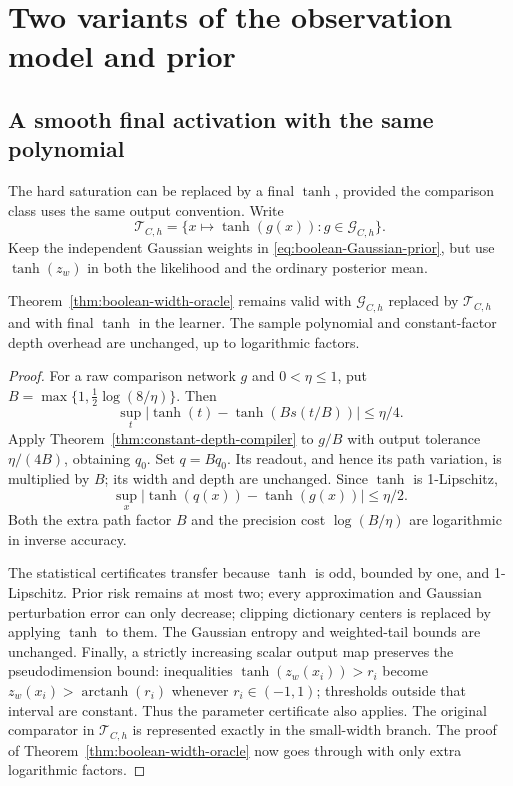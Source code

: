 \section{Two variants of the observation model and prior}
\label{sec:boolean-variants}

\subsection{A smooth final activation with the same polynomial}
The hard saturation can be replaced by a final $\tanh$, provided the comparison class uses the same output convention. Write
\[
 \mathcal T_{C,h}=\{x\mapsto\tanh(g(x)):g\in\mathcal G_{C,h}\}.
\]
Keep the independent Gaussian weights in \eqref{eq:boolean-Gaussian-prior}, but use $\tanh(z_w)$ in both the likelihood and the ordinary posterior mean.

\begin{corollary}
\label{cor:boolean-tanh-output}
Theorem~\ref{thm:boolean-width-oracle} remains valid with $\mathcal G_{C,h}$ replaced by $\mathcal T_{C,h}$ and with final $\tanh$ in the learner. The sample polynomial and constant-factor depth overhead are unchanged, up to logarithmic factors.
\end{corollary}
\begin{proof}
For a raw comparison network $g$ and $0<\eta\le1$, put
$B=\max\{1,\tfrac12\log(8/\eta)\}$. Then
\[
 \sup_t|\tanh(t)-\tanh(Bs(t/B))|\le\eta/4.
\]
Apply Theorem~\ref{thm:constant-depth-compiler} to $g/B$ with output tolerance $\eta/(4B)$, obtaining $q_0$. Set $q=Bq_0$. Its readout, and hence its path variation, is multiplied by $B$; its width and depth are unchanged. Since $\tanh$ is 1-Lipschitz,
\[
 \sup_x|\tanh(q(x))-\tanh(g(x))|\le\eta/2.
\]
Both the extra path factor $B$ and the precision cost $\log(B/\eta)$ are logarithmic in inverse accuracy.

The statistical certificates transfer because $\tanh$ is odd, bounded by one, and 1-Lipschitz. Prior risk remains at most two; every approximation and Gaussian perturbation error can only decrease; clipping dictionary centers is replaced by applying $\tanh$ to them. The Gaussian entropy and weighted-tail bounds are unchanged. Finally, a strictly increasing scalar output map preserves the pseudodimension bound: inequalities $\tanh(z_w(x_i))>r_i$ become $z_w(x_i)>\operatorname{arctanh}(r_i)$ whenever $r_i\in(-1,1)$; thresholds outside that interval are constant. Thus the parameter certificate also applies. The original comparator in $\mathcal T_{C,h}$ is represented exactly in the small-width branch. The proof of Theorem~\ref{thm:boolean-width-oracle} now goes through with only extra logarithmic factors.
\end{proof}

